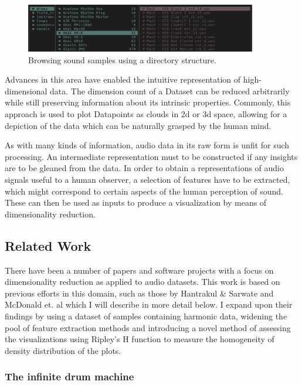 \documentclass[11pt]{article}
\begin{document}
\begin{figure}[h]
\centering
\includegraphics[width=0.9\textwidth]{./Figures/ontologyFE.png}
\caption{Browsing sound samples using a directory structure.}
\end{figure}


Advances in this area have enabled the intuitive representation of high-dimensional data. The dimension count of a Dataset can be reduced arbitrarily while still preserving information about its intrinsic properties. Commonly, this approach is used to plot Datapoints as clouds in 2d or 3d space, allowing for a depiction of the data which can be naturally grasped by the human mind.

As with many kinds of information, audio data in its raw form is unfit for such processing. An intermediate representation must to be constructed if any insights are to be gleaned from the data. In order to obtain a representations of audio signals useful to a human observer, a selection of features have to be extracted, which might correspond to certain aspects of the human perception of sound. These can then be used as inputs to produce a visualization by means of dimensionality reduction.


\subsection{Related Work}
\label{sec:org42eee01}

There have been a number of papers and software projects with a focus on dimensionality reduction as applied to audio datasets. This work is based on previous efforts in this domain, such as those by Hantrakul \& Sarwate \cite{klustr} and McDonald et. al \cite{inf_drum_machine} which I will describe in more detail below. I expand upon their findings by using a dataset of samples containing harmonic data, widening the pool of feature extraction methods and introducing a novel method of assessing the visualizations using Ripley's H function to measure the homogeneity of density distribution of the plots.

\subsubsection{The infinite drum machine}
\label{sec:org4401227}
\end{document}
